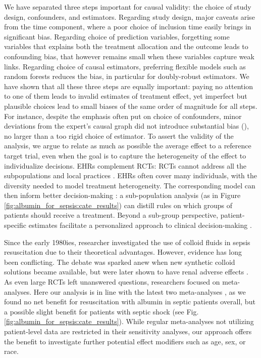 \documentclass[10pt,letterpaper]{article}
\begin{document}
We have separated three steps important for causal validity: the choice
of study design, confounders, and estimators.
%
Regarding study design, major caveats arise from the time component,
where a poor choice of inclusion time easily brings in significant bias. Regarding choice of prediction
variables, forgetting some variables that explains both the treatment
allocation and the outcome leads to confounding bias, that however
remains small when these
variables capture weak links. Regarding choice of causal estimators,
preferring flexible models such as random forests reduces the bias, in
particular for doubly-robust estimators.
%
We have shown that all these three steps are equally important: paying no
attention to one of them leads to invalid estimates of treatment effect,
yet imperfect but plausible choices lead to small biases of the same
order of magnitude for all steps.
%
For instance, despite the emphasis often put on choice of confounders,
minor deviations from the expert's causal graph did not introduce
substantial bias (), no larger than a too
rigid choice of estimator.
To assert the validity of the analysis, we argue to relate as much as
possible the average effect to a reference target trial, even when the
goal is to capture the heterogeneity of the effect to individualize
decisions.
EHRs complement RCTs: RCTs cannot address all the
subpopulations and local practices
\cite{travers2007external,kennedy2015literature}. EHRs often cover many
individuals, with the diversity needed to model treatment
heterogeneity. The corresponding model can then inform better
decision-making \cite{prosperi2020causal}: a sub-population analysis  (as in Figure
\ref{fig:albumin_for_sepsis:cate_results}) can distill rules on which groups
of patients should receive a treatment. Beyond a sub-group perspective,
patient-specific estimates facilitate a personalized approach
to clinical decision-making \cite{kent2018personalized}.

Since the early 1980ies, researcher investigated the use of colloid fluids in
sepsis resuscitation due to their theoretical advantages. However, evidence has
long been conflicting. The debate was sparked anew when new synthetic colloid
solutions became available, but were later shown to have renal adverse effects
\cite{xu2014comparison}. As even large RCTs left unanswered questions,
researchers focused on meta-analyses. Here our analysis is in line with the
latest two meta-analyses \cite{xu2014comparison,li2020resuscitation}, as we
found no net benefit for resuscitation with albumin in septic patients overall,
but a possible slight benefit for patients with septic shock (see Fig.
\ref{fig:albumin_for_sepsis:cate_results}). While regular meta-analyses not
utilizing patient-level data are restricted in their sensitivity analyses, our
approach offers the benefit to investigate further potential effect modifiers
such as age, sex, or race.
\end{document}
